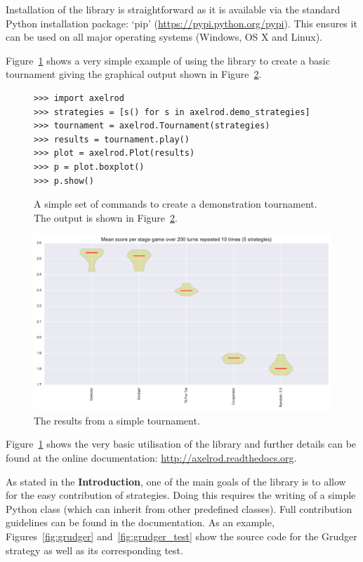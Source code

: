 \documentclass{jors}
\begin{document}
Installation of the library is straightforward as it is available via the
standard Python installation package: `pip'
(\url{https://pypi.python.org/pypi}). This ensures it can be used on all major
operating systems (Windows, OS X and Linux).

Figure~\ref{fig:demo_tournament_commands} shows a very simple example of using
the library to create a basic tournament giving the graphical output shown in
Figure~\ref{fig:demo_tournament}.

\begin{figure}[!hbtp]
    \begin{verbatim}
>>> import axelrod
>>> strategies = [s() for s in axelrod.demo_strategies]
>>> tournament = axelrod.Tournament(strategies)
>>> results = tournament.play()
>>> plot = axelrod.Plot(results)
>>> p = plot.boxplot()
>>> p.show()
    \end{verbatim}
    \caption{A simple set of commands to create a demonstration tournament. The
        output is shown in Figure~\ref{fig:demo_tournament}.}
    \label{fig:demo_tournament_commands}
\end{figure}

\begin{figure}[!hbtp]
	\centering
	\includegraphics[width=.75\textwidth]{demo_tournament.pdf}
	\caption{The results from a simple tournament.}
	\label{fig:demo_tournament}
\end{figure}

Figure~\ref{fig:demo_tournament_commands} shows the very basic utilisation
of the library and further details can be found at the online documentation:
\url{http://axelrod.readthedocs.org}.

As stated in the \textbf{Introduction}, one of the main goals of the library
is to allow for the easy contribution of strategies. Doing this requires the
writing of a simple Python class (which can inherit from other predefined
classes). Full contribution guidelines can be found in the documentation.
As an example, Figures~\ref{fig:grudger} and~\ref{fig:grudger_test} show the source code for
the Grudger strategy as well as its corresponding test.
\end{document}
